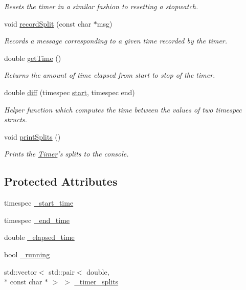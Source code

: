 \begin{DoxyCompactItemize}
\begin{DoxyCompactList}\small\item\em Resets the timer in a similar fashion to resetting a stopwatch. \end{DoxyCompactList}\item 
void \hyperlink{classTimer_a613c775ca0b0b08f7cf1a6c165a6b6f7}{record\-Split} (const char $\ast$msg)
\begin{DoxyCompactList}\small\item\em Records a message corresponding to a given time recorded by the timer. \end{DoxyCompactList}\item 
double \hyperlink{classTimer_a490604efc23a4ff9bef8d1f9f418ecb2}{get\-Time} ()
\begin{DoxyCompactList}\small\item\em Returns the amount of time elapsed from start to stop of the timer. \end{DoxyCompactList}\item 
double \hyperlink{classTimer_a9130267572cd7f17aef6c37d1c55257f}{diff} (timespec \hyperlink{classTimer_a3a8b5272198d029779dc9302a54305a8}{start}, timespec end)
\begin{DoxyCompactList}\small\item\em Helper function which computes the time between the values of two timespec structs. \end{DoxyCompactList}\item 
void \hyperlink{classTimer_a38dd3a8f7acae35cc31490173c8c27f0}{print\-Splits} ()
\begin{DoxyCompactList}\small\item\em Prints the \hyperlink{classTimer}{Timer}'s splits to the console. \end{DoxyCompactList}\end{DoxyCompactItemize}
\subsection*{Protected Attributes}
\begin{DoxyCompactItemize}
\item 
timespec \hyperlink{classTimer_a6f90c97bbab6f9f68249027e5705e7f0}{\-\_\-start\-\_\-time}
\item 
timespec \hyperlink{classTimer_a8263ea8a07c2e7b18fcc2a14ba6975e6}{\-\_\-end\-\_\-time}
\item 
double \hyperlink{classTimer_ab03f4401286530b40bdc8ec65e98b5cf}{\-\_\-elapsed\-\_\-time}
\item 
bool \hyperlink{classTimer_a0e92367e8b9f4fe50e7395d01db259af}{\-\_\-running}
\item 
std\-::vector$<$ std\-::pair$<$ double, \\*
const char $\ast$ $>$ $>$ \hyperlink{classTimer_a92ba53954cd01cbd9afe2e397e529d35}{\-\_\-timer\-\_\-splits}
\end{DoxyCompactItemize}


